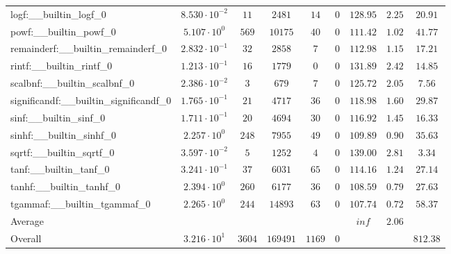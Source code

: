 \begin{tabular}{|l|c|c|c|c|c|c|c|c|}
logf:\_\_builtin\_logf\_0                 & $ 8.530 \cdot 10^{-2} $ & $ 11     $ & $ 2481   $ & $ 14   $ & $ 0   $ & $ 128.95      $ & $ 2.25    $ & $ 20.91   $ \\
powf:\_\_builtin\_powf\_0                 & $ 5.107 \cdot 10^{0}  $ & $ 569    $ & $ 10175  $ & $ 40   $ & $ 0   $ & $ 111.42      $ & $ 1.02    $ & $ 41.77   $ \\
remainderf:\_\_builtin\_remainderf\_0     & $ 2.832 \cdot 10^{-1} $ & $ 32     $ & $ 2858   $ & $ 7    $ & $ 0   $ & $ 112.98      $ & $ 1.15    $ & $ 17.21   $ \\
rintf:\_\_builtin\_rintf\_0               & $ 1.213 \cdot 10^{-1} $ & $ 16     $ & $ 1779   $ & $ 0    $ & $ 0   $ & $ 131.89      $ & $ 2.42    $ & $ 14.85   $ \\
scalbnf:\_\_builtin\_scalbnf\_0           & $ 2.386 \cdot 10^{-2} $ & $ 3      $ & $ 679    $ & $ 7    $ & $ 0   $ & $ 125.72      $ & $ 2.05    $ & $ 7.56    $ \\
significandf:\_\_builtin\_significandf\_0 & $ 1.765 \cdot 10^{-1} $ & $ 21     $ & $ 4717   $ & $ 36   $ & $ 0   $ & $ 118.98      $ & $ 1.60    $ & $ 29.87   $ \\
sinf:\_\_builtin\_sinf\_0                 & $ 1.711 \cdot 10^{-1} $ & $ 20     $ & $ 4694   $ & $ 30   $ & $ 0   $ & $ 116.92      $ & $ 1.45    $ & $ 16.33   $ \\
sinhf:\_\_builtin\_sinhf\_0               & $ 2.257 \cdot 10^{0}  $ & $ 248    $ & $ 7955   $ & $ 49   $ & $ 0   $ & $ 109.89      $ & $ 0.90    $ & $ 35.63   $ \\
sqrtf:\_\_builtin\_sqrtf\_0               & $ 3.597 \cdot 10^{-2} $ & $ 5      $ & $ 1252   $ & $ 4    $ & $ 0   $ & $ 139.00      $ & $ 2.81    $ & $ 3.34    $ \\
tanf:\_\_builtin\_tanf\_0                 & $ 3.241 \cdot 10^{-1} $ & $ 37     $ & $ 6031   $ & $ 65   $ & $ 0   $ & $ 114.16      $ & $ 1.24    $ & $ 27.14   $ \\
tanhf:\_\_builtin\_tanhf\_0               & $ 2.394 \cdot 10^{0}  $ & $ 260    $ & $ 6177   $ & $ 36   $ & $ 0   $ & $ 108.59      $ & $ 0.79    $ & $ 27.63   $ \\
tgammaf:\_\_builtin\_tgammaf\_0           & $ 2.265 \cdot 10^{0}  $ & $ 244    $ & $ 14893  $ & $ 63   $ & $ 0   $ & $ 107.74      $ & $ 0.72    $ & $ 58.37   $ \\
\hline
Average                                   & $                     $ & $        $ & $        $ & $      $ & $     $ & $ inf         $ & $ 2.06    $ & $         $ \\
\hline
Overall                                   & $ 3.216 \cdot 10^{1}  $ & $ 3604   $ & $ 169491 $ & $ 1169 $ & $ 0   $ & $             $ & $         $ & $ 812.38  $ \\
\hline
\end{tabular}
